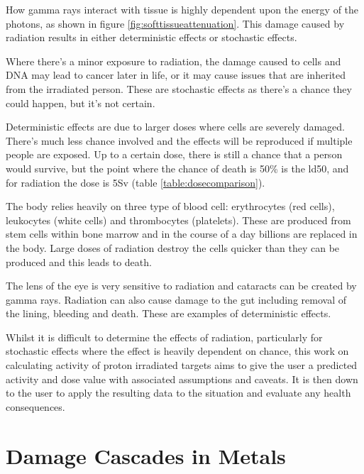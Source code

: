 How gamma rays interact with tissue is highly dependent upon the energy of the photons, as shown in figure \ref{fig:softtissueattenuation}.  This damage caused by radiation results in either deterministic effects or stochastic effects.  

Where there's a minor exposure to radiation, the damage caused to cells and DNA may lead to cancer later in life, or it may cause issues that are inherited from the irradiated person.  These are stochastic effects as there's a chance they could happen, but it's not certain.

Deterministic effects are due to larger doses where cells are severely damaged.  There's much less chance involved and the effects will be reproduced if multiple people are exposed.  Up to a certain dose, there is still a chance that a person would survive, but the point where the chance of death is 50\% is the \gls{ld50}, and for radiation the dose is 5Sv (table \ref{table:dosecomparison}).

The body relies heavily on three type of blood cell: erythrocytes (red cells), leukocytes (white cells) and thrombocytes (platelets).  These are produced from stem cells within bone marrow and in the course of a day billions are replaced in the body.  Large doses of radiation destroy the cells quicker than they can be produced and this leads to death.  

The lens of the eye is very sensitive to radiation and cataracts can be created by gamma rays.  Radiation can also cause damage to the gut including removal of the lining, bleeding and death.  These are examples of deterministic  effects.

Whilst it is difficult to determine the effects of radiation, particularly for stochastic effects where the effect is heavily dependent on chance, this work on calculating activity of proton irradiated targets aims to give the user a predicted activity and dose value with associated assumptions and caveats.  It is then down to the user to apply the resulting data to the situation and evaluate any health consequences.





\FloatBarrier

\section{Damage Cascades in Metals}

